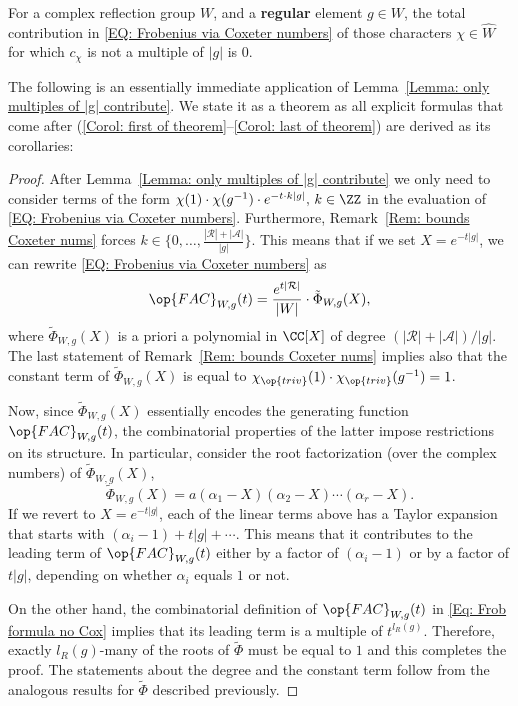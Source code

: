 \begin{lemma}
\label{Lemma: only multiples of |g| contribute}
For a complex reflection group $W$, and a \textbf{regular} element $g\in W$, the total contribution in \eqref{EQ: Frobenius via Coxeter numbers} of those characters $\chi\in\widehat{W}$ for which $c_{\chi}$ is not a multiple of $|g|$ is $0$.
\end{lemma}


The following is an essentially immediate application of Lemma~\ref{Lemma: only multiples of |g| contribute}. We state it as a theorem as all explicit formulas that come after (\ref{Corol: first of theorem}--\ref{Corol: last of theorem}) are derived as its corollaries:


\mainthm
\begin{proof}
After Lemma~\ref{Lemma: only multiples of |g| contribute} we only need to consider terms of the form $\chi(1)\cdot\chi(g^{-1})\cdot e^{-t\cdot k|g|},\,k\in\ZZ$ in the evaluation of \eqref{EQ: Frobenius via Coxeter numbers}. Furthermore, Remark~\ref{Rem: bounds Coxeter nums} forces $k\in \{0,\dots,\frac{|\mathcal{R}|+|\mathcal{A}|}{|g|}\}$. This means that if we set $X=e^{-t|g|}$, we can rewrite \eqref{EQ: Frobenius via Coxeter numbers} as $$\op{FAC}_{W,g}(t)=\dfrac{e^{t|\mathcal{R}|}}{|W|}\cdot \tilde{\Phi}_{W,g}(X),$$ where $\tilde{\Phi}_{W,g}(X)$ is a priori a polynomial in $\CC[X]$ of degree $(|\mathcal{R}|+|\mathcal{A}|)/|g|$. The last statement of Remark~\ref{Rem: bounds Coxeter nums} implies also that the constant term of $\tilde{\Phi}_{W,g}(X)$ is equal to $\chi_{\op{triv}}(1)\cdot\chi_{\op{triv}}(g^{-1})=1$.


Now, since $\tilde{\Phi}_{W,g}(X)$ essentially encodes the generating function $\op{FAC}_{W,g}(t)$, the combinatorial properties of the latter impose restrictions on its structure. In particular, consider the root factorization (over the complex numbers) of $\tilde{\Phi}_{W,g}(X)$,
\[
\tilde{\Phi}_{W,g}(X)=a(\alpha_1-X)(\alpha_2-X)\cdots (\alpha_r-X).
\]
If we revert to $X=e^{-t|g|}$, each of the linear terms above has a Taylor expansion that starts with $(\alpha_i-1)+t|g|+\cdots$. This means that it contributes to the leading term of $\op{FAC}_{W,g}(t)$ either by a factor of $(\alpha_i-1)$ or by a factor of $t|g|$, depending on whether $\alpha_i$ equals $1$ or not.

On the other hand, the combinatorial definition of $\op{FAC}_{W,g}(t)$ in \eqref{Eq: Frob formula no Cox} implies that its leading term is a multiple of $t^{l_R(g)}$. Therefore, exactly $l_{R}(g)$-many of the roots of $\tilde{\Phi}$ must be equal to $1$ and this completes the proof. The statements about the degree and the constant term follow from the analogous results for $\tilde{\Phi}$ described previously. 
\end{proof}

